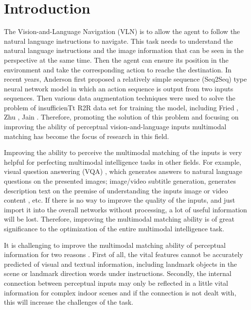 \section{Introduction}
\label{intro}

The Vision-and-Language Navigation (VLN) is to allow the agent to follow the natural language instructions to navigate. This task needs to understand the natural language instructions and the image information that can be seen in the perspective at the same time. Then the agent can ensure its position in the environment and take the corresponding action to reache the destination. In recent years, Anderson \cite{anderson2018vision} first proposed a relatively simple sequence (Seq2Seq) type neural network model in which an action sequence is output from two inputs sequences. Then various data augmentation techniques were used to solve the problem of insufficienTt R2R data set for training the model, including Fried \cite{fried2018speaker}, Zhu \cite{zhu20201vision}, Jain \cite{jain2019stay}. Therefore, promoting the solution of this problem and focusing on improving the ability of perceptual vision-and-language inputs multimodal matching has become the focus of research in this field.

Improving the ability to perceive the multimodal matching of the inputs is very helpful for perfecting multimodal intelligence tasks in other fields. For example, visual question answering (VQA) \cite{antol2015vqa}, which generates answers to natural language questions on the presented images; image/video subtitle generation, generates description text on the premise of understanding the inputs image or video content \cite{das2017visual}, etc. If there is no way to improve the quality of the inputs, and just import it into the overall networks without processing, a lot of useful information will be lost. Therefore, improving the multimodal matching ability is of great significance to the optimization of the entire multimodal intelligence task.

It is challenging to improve the multimodal matching ability of perceptual information for two reasons \cite{fried2018speaker,landi2019embodied,hwang2021joint}. First of all, the vital features cannot be accurately predicted of visual and textual information, including landmark objects in the scene or landmark direction words under instructions. Secondly, the internal connection between perceptual inputs may only be reflected in a little vital information for complex indoor scenes and if the connection is not dealt with, this will increase the challenges of the task.

